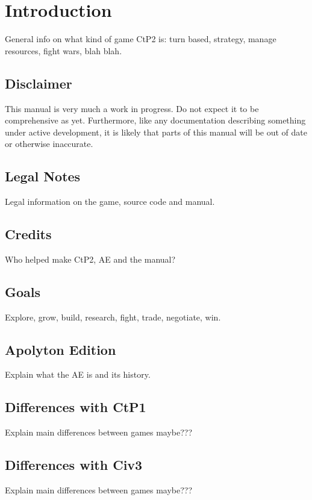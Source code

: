 \chapter{Introduction}

General info on what kind of game CtP2 is: turn based, strategy, manage resources, fight wars, blah blah.

\section{Disclaimer}
This manual is very much a work in progress.  Do not expect it to be
comprehensive as yet.  Furthermore, like any documentation describing something
under active development, it is likely that parts of this manual will be out of
date or otherwise inaccurate.

\section{Legal Notes}
Legal information on the game, source code and manual.

\section{Credits}
Who helped make CtP2, AE and the manual?

\section{Goals}
Explore, grow, build, research, fight, trade, negotiate, win.

\section{Apolyton Edition}
Explain what the AE is and its history.

\section{Differences with CtP1}
Explain main differences between games maybe???

\section{Differences with Civ3}
Explain main differences between games maybe???

